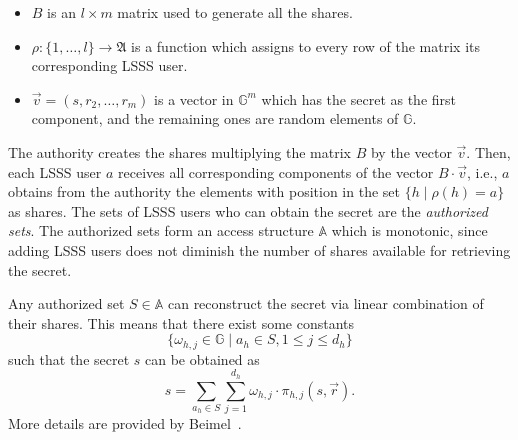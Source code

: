 \documentclass[a4paper,10pt]{article}
\newcommand{\G}{\mathbb{G}}
\begin{document}
	\begin{itemize}
		\item
		$B$ is an $l\times m$ matrix used to generate all the shares.
		\item
		$\rho: \{1,\ldots,l \}\rightarrow \mathfrak{A}$ is a function which assigns to every row of the matrix its corresponding LSSS user.
		\item
		$\vec{v}=\left(s,r_2,\ldots,r_{m}\right)$ is a vector in $\G^{m}$ which has the secret as the first component, and the remaining ones are random elements of $\G$.
	\end{itemize}
The authority creates the shares multiplying the matrix $B$ by the vector $\vec{v}$. Then, each LSSS user $a$ receives all  corresponding components of the vector $B\cdot \vec{v}$, i.e., $a$ obtains from the authority the elements with position in the set $\{h\mid \rho(h)=a\}$ as shares. The sets of LSSS users who can obtain the secret are the \emph{authorized sets}. The authorized sets form an access structure $\mathbb{A}$ which is monotonic, since adding LSSS users does not diminish the number of shares available for retrieving the secret.


Any authorized set $S\in \mathbb{A}$ can reconstruct the secret via linear combination of their shares. This means that there exist some constants 
			\[ \{ \omega_{h,j} \in \G \mid a_h\in S, 1\leq j\leq d_h \} \]
			such that the secret $s$ can be obtained as
			\[ s=\sum_{a_h \in S} \sum_{j=1}^{d_h} \omega_{h,j} \cdot \pi_{h,j}(s,\vec{r}) . \]
			More details are provided by Beimel~\cite{beimel1996SSS}.
\end{document}
